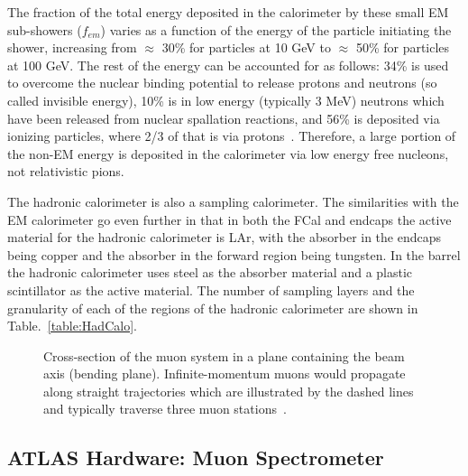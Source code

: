 The fraction of the total energy deposited in the calorimeter by these small EM sub-showers ($f_{em}$) varies as a function of the energy of the particle initiating the shower, increasing from $\approx$ 30\% for particles at 10 GeV to $\approx$ 50\% for particles at 100 GeV.  
The rest of the energy can be accounted for as follows: 34\% is used to overcome the nuclear binding potential to release protons and neutrons (so called invisible energy), 10\% is in low energy (typically 3 MeV) neutrons which have been released from nuclear spallation reactions, and 56\% is deposited via ionizing particles, where 2/3 of that is via protons~\cite{Wigmans2008}.  
Therefore, a large portion of the non-EM energy is deposited in the calorimeter via low energy free nucleons, not relativistic pions.  

The hadronic calorimeter is also a sampling calorimeter.  
The similarities with the EM calorimeter go even further in that in both the FCal and endcaps the active material for the hadronic calorimeter is LAr, with the absorber in the endcaps being copper and the absorber in the forward region being tungsten.  
In the barrel the hadronic calorimeter uses steel as the absorber material and a plastic scintillator as the active material.  
The number of sampling layers and the granularity of each of the regions of the hadronic calorimeter are shown in Table.~\ref{table:HadCalo}. 


\begin{figure}[!ht]
  \begin{center}
  \end{center}
  \caption[Grafic showing different particle interactions]
      {\small Cross-section of the muon system in a plane containing the beam axis (bending plane). Infinite-momentum muons would propagate along straight trajectories which are illustrated by the dashed lines and typically traverse three muon stations~\cite{JOIATLAS}.}
  \label{MuonSpectroFig}
\end{figure}


\subsection{ATLAS Hardware: Muon Spectrometer}

